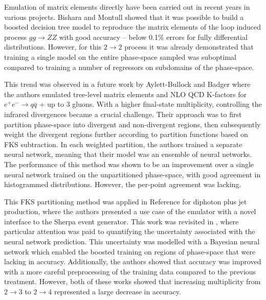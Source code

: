 \documentclass[main.tex]{subfiles}
\begin{document}
    Emulation of matrix elements directly have been
    carried out in recent years in various projects.
    Bishara and Montull showed \cite{Bishara:2019iwh} that it was possible to
    build a boosted decision tree model to reproduce
    the matrix elements of the loop induced process $gg \rightarrow ZZ$ with good accuracy --
    below 0.1\% errors for fully differential distributions.
    However, for this $2 \rightarrow 2$ process it was already demonstrated
    that training a single model on the entire phase-space sampled
    was suboptimal compared to training a number of regressors
    on subdomains of the phase-space.

    This trend was observed in a future work by Aylett-Bullock
    and Badger \cite{Badger:2020uow} where the authors emulated tree-level
    matrix elements and NLO QCD K-factors for $e^{+}e^{-} \rightarrow q \bar{q}$ +
    up to 3 gluons. With a higher final-state multiplicity, controlling
    the infrared divergences became a crucial challenge.
    Their approach was to first partition phase-space
    into divergent and non-divergent regions, then subsequently
    weight the divergent regions further according to partition functions
    based on FKS subtraction.
    In each weighted partition, the authors trained a separate neural network,
    meaning that their model was an ensemble of neural networks.
    The performance of this method was shown to be an improvement
    over a single neural network trained on the unpartitioned phase-space,
    with good agreement in histogrammed distributions. However,
    the per-point agreement was lacking.

    This FKS partitioning method was applied in Reference \cite{Aylett-Bullock:2021hmo}
    for diphoton plus jet production, where the authors presented a
    use case of the emulator with a novel interface to the Sherpa event generator.
    This work was revisited in \cite{Badger:2022hwf},
    where particular attention was paid to quantifying the uncertainty associated
    with the neural network prediction. This uncertainty was
    modelled with a Bayesian neural network which enabled
    the boosted training on regions of phase-space that were
    lacking in accuracy. Additionally, the authors showed
    that accuracy was improved with a more careful
    preprocessing of the training data compared to
    the previous treatment.
    However, both of these works showed that increasing
    multiplicity from $2 \rightarrow 3$ to $2 \rightarrow 4$
    represented a large decrease in accuracy.
\end{document}
